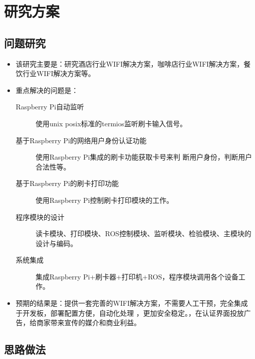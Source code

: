 \chapter{研究方案}


\section{问题研究}

\begin{itemize}
\item 该研究主要是：研究酒店行业WIFI解决方案，咖啡店行业WIFI解决方案，餐饮行业WIFI解决方案等。
\item 重点解决的问题是：
  \begin{description}
  \item[Raspberry Pi自动监听] 使用unix posix标准的termios\cite{termio}监听刷卡输入信号。
  \item[基于Raspberry Pi的网络用户身份认证功能] 使用Raspberry Pi集成的刷卡功能获取卡号来判
    断用户身份，判断用户合法性等。
  \item[基于Raspberry Pi的刷卡打印功能] 使用Raspberry Pi控制刷卡打印模块的工作。
  \item[程序模块的设计] 读卡模块、打印模块、ROS控制模块、监听模块、检验模块、主模块的设计与编码。
  \item[系统集成] 集成Raspberry Pi+刷卡器+打印机+ROS，程序模块调用各个设备工作。
  \end{description}
\item 预期的结果是：提供一套完善的WIFI解决方案，不需要人工干预，完全集成于开发板，部署配置方便，自动化处理
，更加安全稳定。，在认证界面投放广告，给商家带来宣传的媒介和商业利益。
\end{itemize}


\section{思路做法}

